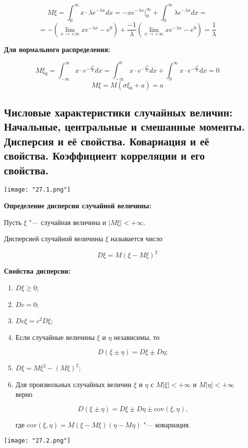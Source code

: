     \[
        M\xi = \int^{\infty}_0 x \cdot \lambda e^{-\lambda x} dx =
        -x e^{-\lambda x} |^{\infty}_0 + \int^{\infty}_0 \lambda e^{-\lambda x} dx =
    \]
    \[
        =
        - (\lim_{x \to +\infty} x e^{-\lambda x} - e^0) + \frac{-1}{\lambda}
        (\lim_{x \to +\infty} x e^{-\lambda x} - e^0) = \frac{1}{\lambda}  
    \]
    \bigskip

\textbf{Для нормального распределения:}
    \smallskip
    
    \[
        M\xi_0 = \int^{\infty}_{-\infty} x \cdot e^{-\frac{x^2}{2}} dx =
        \int^{0}_{-\infty} x \cdot e^{-\frac{x^2}{2}} dx +
        \int^{\infty}_{0} x \cdot e^{-\frac{x^2}{2}} dx = 0
    \]
    \[
        M\xi = M(\sigma \xi_0 + a) = a  
    \]

\subsection{Числовые характеристики случайных величин: Начальные,
центральные и смешанные моменты. Дисперсия и её свойства. Ковариация и её свойства.
Коэффициент корреляции и его свойства.}

\begin{center}
    \texttt{[image: "27.1.png"]}
\end{center}

\textbf{Определение дисперсии случайной величины:}
    \smallskip

    Пусть $\xi$ "--- случайная величина и $|M\xi| < +\infty$.
    \bigskip

    Дисперсией случайной величины $\xi$ называется число 

    \[
    D\xi = M(\xi - M\xi)^2
    \]

\textbf{Свойства дисперсии:}
    \smallskip

    \begin{enumerate}
        \item{$D\xi \geq 0$;}
        \item{$Dc = 0$;}
        \item{$Dc\xi = c^2 D\xi$;}
        \item{Если случайные величины $\xi$ и $\eta$ независимы, то
        
        \[
            D(\xi \pm \eta) = D\xi \pm D\eta;
        \]
        }
        \item{$D\xi = M\xi^{2} - (M\xi)^2$;}
        \item{Для произвольных случайных величин $\xi$ и $\eta$ с
        $M|\xi| < + \infty$ и $M|\eta| < + \infty$ верно
        
        \[
            D(\xi \pm \eta) = D\xi \pm D\eta \pm {\text{cov}(\xi, \eta)},
        \]

        где ${\text{cov}(\xi, \eta)} = M(\xi - M\xi)(\eta - M\eta)$ "--- ковариация.
        }
    \end{enumerate}

    \begin{center}
        \texttt{[image: "27.2.png"]}
    \end{center}

